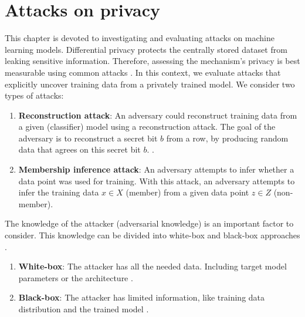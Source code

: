 \chapter{Attacks on privacy} \label{section: MIA}
This chapter is devoted to investigating and evaluating attacks on machine learning models.
Differential privacy protects the centrally stored dataset from leaking sensitive information.
Therefore, assessing the mechanism's privacy is best measurable using common attacks \citep{jayaraman_evaluating_nodate}.
In this context, we evaluate attacks that explicitly uncover training data from a privately trained model.
We consider two types of attacks:
\begin{enumerate}
  \item \textbf{Reconstruction attack}:  An adversary could reconstruct training data from a given (classifier) model using a reconstruction attack. The goal of the adversary is to reconstruct a secret bit $b$ from a row, by producing random data that agrees on this secret bit $b$. \citep{dwork_exposed_2017}. 
  \item \textbf{Membership inference attack}: An adversary attempts to infer whether a data point was used for training. With this attack, an adversary attempts to infer the training data $x \in X$ (member) from a given data point $z \in Z$ (non-member).

\end{enumerate}
The knowledge of the attacker (adversarial knowledge) is an important factor to consider.
This knowledge can be divided into white-box and black-box approaches \citep{hu_membership_2022}.
\begin{enumerate}
  \item \textbf{White-box}: The attacker has all the needed data. Including target model parameters or the architecture \citep{hu_membership_2022}.
  \item \textbf{Black-box}: The attacker has limited information, like training data distribution and the trained model \citep{hu_membership_2022}.
\end{enumerate}
